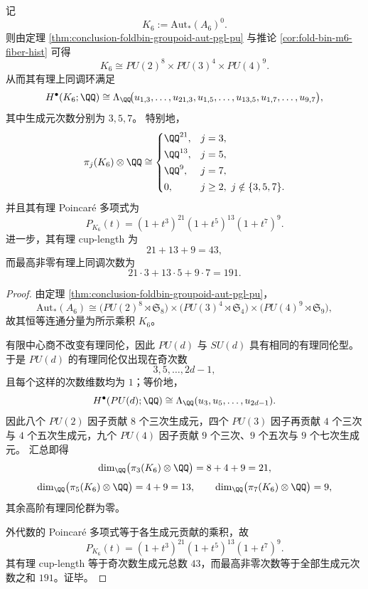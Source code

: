 \begin{theorem}\label{thm:conclusion-foldbin-window6-rational-homotopy-poincare}
记
\[
K_6:=\mathrm{Aut}_{\ast}(A_6)^0.
\]
则由定理 \ref{thm:conclusion-foldbin-groupoid-aut-pgl-pu} 与推论 \ref{cor:fold-bin-m6-fiber-hist} 可得
\[
K_6\cong PU(2)^8\times PU(3)^4\times PU(4)^9.
\]
从而其有理上同调环满足
\[
H^\bullet(K_6;\QQ)
\cong
\Lambda_{\QQ}\!\bigl(
u_{1,3},\dots,u_{21,3},
u_{1,5},\dots,u_{13,5},
u_{1,7},\dots,u_{9,7}
\bigr),
\]
其中生成元次数分别为 \(3,5,7\)。
特别地，
\[
\pi_j(K_6)\otimes\QQ\cong
\begin{cases}
\QQ^{21},& j=3,\\[2pt]
\QQ^{13},& j=5,\\[2pt]
\QQ^{9},& j=7,\\[2pt]
0,& j\ge 2,\ j\notin\{3,5,7\}.
\end{cases}
\]
并且其有理 Poincar\'e 多项式为
\[
P_{K_6}(t)=(1+t^3)^{21}(1+t^5)^{13}(1+t^7)^9.
\]
进一步，其有理 cup-length 为
\[
21+13+9=43,
\]
而最高非零有理上同调次数为
\[
21\cdot 3+13\cdot 5+9\cdot 7=191.
\]
\end{theorem}
\begin{proof}
由定理 \ref{thm:conclusion-foldbin-groupoid-aut-pgl-pu}，
\[
\mathrm{Aut}_{\ast}(A_6)
\cong
\bigl(PU(2)^8\rtimes \mathfrak S_8\bigr)
\times
\bigl(PU(3)^4\rtimes \mathfrak S_4\bigr)
\times
\bigl(PU(4)^9\rtimes \mathfrak S_9\bigr),
\]
故其恒等连通分量为所示乘积 \(K_6\)。

有限中心商不改变有理同伦，因此 \(PU(d)\) 与 \(SU(d)\) 具有相同的有理同伦型。
于是 \(PU(d)\) 的有理同伦仅出现在奇次数
\[
3,5,\dots,2d-1,
\]
且每个这样的次数维数均为 \(1\)；等价地，
\[
H^\bullet(PU(d);\QQ)\cong
\Lambda_{\QQ}(u_3,u_5,\dots,u_{2d-1}).
\]
因此八个 \(PU(2)\) 因子贡献 \(8\) 个三次生成元，四个 \(PU(3)\) 因子再贡献 \(4\) 个三次与 \(4\) 个五次生成元，九个 \(PU(4)\) 因子贡献 \(9\) 个三次、\(9\) 个五次与 \(9\) 个七次生成元。
汇总即得
\[
\dim_{\QQ}\bigl(\pi_3(K_6)\otimes\QQ\bigr)=8+4+9=21,
\]
\[
\dim_{\QQ}\bigl(\pi_5(K_6)\otimes\QQ\bigr)=4+9=13,
\qquad
\dim_{\QQ}\bigl(\pi_7(K_6)\otimes\QQ\bigr)=9,
\]
其余高阶有理同伦群为零。

外代数的 Poincar\'e 多项式等于各生成元贡献的乘积，故
\[
P_{K_6}(t)=(1+t^3)^{21}(1+t^5)^{13}(1+t^7)^9.
\]
其有理 cup-length 等于奇次数生成元总数 \(43\)，而最高非零次数等于全部生成元次数之和 \(191\)。证毕。
\end{proof}

